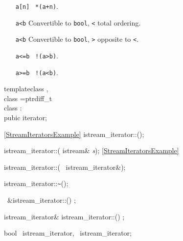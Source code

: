 \begin{multicols}{4}
\begin{itemize}
  \item[\texttt{a[n]}] \lra\ \texttt{*(a+n)}.

  \item[\texttt{a<b}]  Convertible to \texttt{bool}, \texttt{<} total ordering.

  \item[\texttt{a<b}]  Convertible to \texttt{bool},
                       \texttt{>} opposite to \texttt{<}.

  \item[\texttt{a<=b}]  \lra\ \texttt{!(a>b)}.
  \item[\texttt{a>=b}]  \lra\ \texttt{!(a<b)}.


\end{itemize}


 \label{StreamIterators}

\begin{templdec}
template\<class \T,\\
\phantemp class \Distance=ptrdiff_t\>\\
class  :\\
\phantom{class }pubic iterator;\\
\end{templdec}

\quad\seeExample\ref{StreamIteratorsExample}\newline
istream_iterator::(); 

istream_iterator::(\newline
\phantom{ABC}istream\& \emph{s}); \quad\seeExample\ref{StreamIteratorsExample}

istream_iterator::(\newline
\phantom{ABC}\const\ istream_iterator\TP{\T, \Distance}\&);

istream_iterator::\verb+~+();

\const\ \T\&\enskip istream_iterator::\operstar() \const;

istream_iterator\& \newline
istream_iterator::\operpp() \const;

bool \newline
\opereq\lp\const\ istream_iterator,\newline
\phantom{\opereq\lp}\const\ istream_iterator\rp;


\end{multicols}
